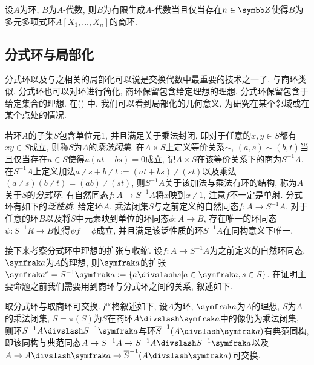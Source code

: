 \begin{proposition}\label{prop:fgalgebra}
    设$A$为环, $B$为$A$-代数, 则$B$为有限生成$A$-代数当且仅当存在$n\in \ZZ$使得$B$为多元多项式环$A[X_1, \dotsc, X_n]$的商环.
\end{proposition}

\subsection{分式环与局部化}

分式环以及与之相关的局部化可以说是交换代数中最重要的技术之一了. 与商环类似, 分式环也可以对环进行简化, 商环保留包含给定理想的理想, 分式环保留包含于给定集合的理想. 在()%
中, 我们可以看到局部化的几何意义, 为研究在某个邻域或在某个点处的情况.

若环$A$的子集$S$包含单位元1, 并且满足关于乘法封闭, 即对于任意的$x, y\in S$都有$xy\in S$成立, 则称$S$为$A$的\emph{乘法闭集}. 在$A\times S$上定义等价关系$\sim$, $(a, s)\sim (b, t)$当且仅当存在$u\in S$使得$u(at-bs)=0$成立, 记$A\times S$在该等价关系下的商为$S^{-1}A$. 在$S^{-1}A$上定义加法$a{\divslash} s+b{\divslash}t := (at+bs){\divslash}(st)$以及乘法$(a{\divslash}s)(b{\divslash}t)=(ab){\divslash}(st)$, 则$S^{-1}A$关于该加法与乘法有环的结构, 称为$A$关于$S$的\emph{分式环}. 有自然同态$f\colon A\to S^{-1}A$将$x$映到$x{\divslash}1$, 注意$f$不一定是单射. 分式环有如下的\emph{泛性质}\parencites[81, Theorem 11.3]{altman_term_2017}[37, Proposition 3.1]{atiyah_introduction_1969}, 给定环$A$, 乘法闭集$S$与之前定义的自然同态$f\colon A\to S^{-1}A$, 对于任意的环$B$以及将$S$中元素映到单位的环同态$\phi\colon A\to B$, 存在唯一的环同态$\psi\colon S^{-1}R\to B$使得$\psi f=\phi$成立, 并且满足该泛性质的环$S^{-1}A$在同构意义下唯一.

接下来考察分式环中理想的扩张与收缩. 设$f\colon A\to S^{-1}A$为之前定义的自然环同态, $\ideal{a}$为$A$的理想, 则$\ideal{a}$的扩张$\ideal{a}^e=S^{-1}\ideal{a}:=\{a{\divslash}s\vert a\in\ideal{a}, s\in S\}$. 在证明主要命题之前我们需要用到商环与分式环之间的关系, 叙述如下.

\begin{proposition}
    取分式环与取商环可交换. 严格叙述如下, 设$A$为环, $\ideal{a}$为$A$的理想, $S$为$A$的乘法闭集, $\overline{S}=\pi(S)$为$S$在商环$A{\divslash}\ideal{a}$中的像仍为乘法闭集, 则环$\SASa$与环$\SAa$有典范同构, 即该同构与典范同态$A\to S^{-1}A\to \SASa$以及$A\to A{\divslash}\ideal{a}\to \SAa$可交换.
\end{proposition}

